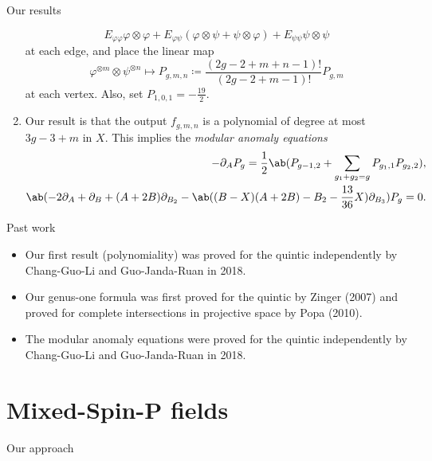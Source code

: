 \documentclass[10pt]{beamer}
\newcommand{\1}{\mathbf{1}}
\newcommand{\2}{\mathbf{2}}
\newcommand{\3}{\mathbf{3}}
\theoremstyle{definition}
\theoremstyle{remark}
\theoremstyle{plain}
\theoremstyle{definition}
\theoremstyle{remark}
\begin{document}
\begin{frame}{Our results}
\begin{enumerate}
    \[ E_{\varphi\varphi}\varphi\otimes \varphi + E_{\varphi\psi}(\varphi \otimes \psi + \psi \otimes \varphi) + E_{\psi\psi} \psi \otimes \psi \]
    at each edge, and place the linear map
    \[ \varphi^{\otimes m} \otimes \psi^{\otimes n} \mapsto P_{g,m,n} \coloneqq \frac{(2g-2+m+n-1)!}{(2g-2+m-1)!} P_{g,m} \]
    at each vertex. Also, set $P_{1,0,1} = -\frac{19}{2}$.
    \item Our result is that the output $f_{g,m,n}$ is a polynomial of degree at most $3g-3+m$ in $X$. This implies the \textit{modular anomaly equations}
    \footnotesize
    \begin{align*}
      - \partial_{A} P_g = \frac{1}{2} \ab(P_{g-1,2} + \sum_{g_1+g_2 = g} P_{g_1, 1} P_{g_2, 2}),  \\
      \ab(-2 \partial_{A} + \partial_{B} + (A+2B) \partial_{B_2} - \ab((B-X)(A+2B)-B_2-\frac{13}{36} X)\partial_{B_3})P_g = 0.
    \end{align*}
  \end{enumerate}
\end{frame}

\begin{frame}{Past work}
  \begin{itemize}[<+->]
    \item Our first result (polynomiality) was proved for the quintic independently by Chang-Guo-Li and Guo-Janda-Ruan in 2018.
    \item Our genus-one formula was first proved for the quintic by Zinger (2007) and proved for complete intersections in projective space by Popa (2010).
    \item The modular anomaly equations were proved for the quintic independently by Chang-Guo-Li and Guo-Janda-Ruan in 2018.
  \end{itemize}
\end{frame}

\section{Mixed-Spin-P fields}
\begin{frame}{Our approach}

\end{frame}
\end{document}

